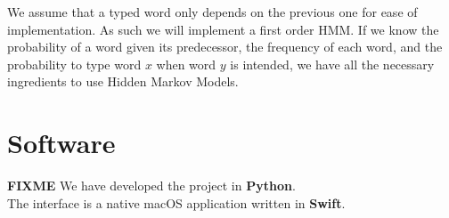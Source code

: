We assume that a typed word only depends on the previous one for ease of implementation. As such we will implement a first order HMM. 
If we know the probability of a word given its predecessor, the frequency of each word, and the probability to type word $x$ when word $y$ is intended, we 
have all the necessary ingredients to use Hidden Markov Models.

\section{Software}
\textbf{FIXME}
We have developed the project in \textbf{Python}.\\
The interface is a native macOS application written in \textbf{Swift}.
